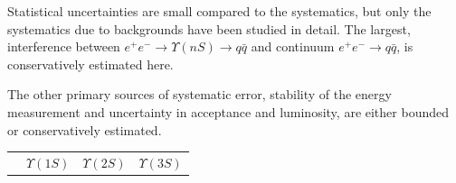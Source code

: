 \newpage

Statistical uncertainties are small compared to the systematics, but
only the systematics due to backgrounds have been studied in detail.
The largest, interference between $e^+ e^- \to \Upsilon(nS) \to
q\bar{q}$ and continuum $e^+ e^- \to q\bar{q}$, is conservatively
estimated here.

The other primary sources of systematic error, stability of the energy
measurement and uncertainty in acceptance and luminosity, are either
bounded or conservatively estimated.

\vfill

\begin{minipage}{6in}
\begin{center}
\huge {}
\end{center}
\large

\vspace{0.25cm}

\hspace{-0.2cm} \begin{minipage}{\linewidth}
  \begin{tabular}{p{4.5cm} c c c}
    & {\LARGE $\Upsilon(1S)$} & {\LARGE $\Upsilon(2S)$} & {\LARGE $\Upsilon(3S)$} \vspace{0.25cm} \\


\end{tabular}
\end{minipage}
\end{minipage}
